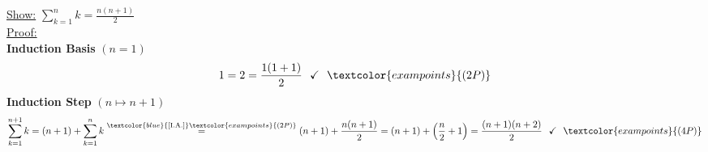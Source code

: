 {\color{solution}
\underline{Show:} 
$\sum_{k=1}^{n}k =\frac{n(n+1)}{2}$\\
\underline{Proof:}\\
\textbf{Induction Basis } $(n=1)$
$$
1=2=\frac{1(1+1)}{2}~~\checkmark~~\textcolor{exampoints}{(2P)}
$$
\textbf{Induction Step} $(n \mapsto n+1)$
$$
\sum_{k=1}^{n+1}k=(n+1)+\sum_{k=1}^{n}k\stackrel{\textcolor{blue}{\text{[I.A.]}}\textcolor{exampoints}{(2P)}}{=} (n+1)+\frac{n(n+1)}{2}=(n+1)+\left(\frac{n}{2}+1\right)=\frac{(n+1)(n+2)}{2}~~\checkmark~~\textcolor{exampoints}{(4P)}
$$
}